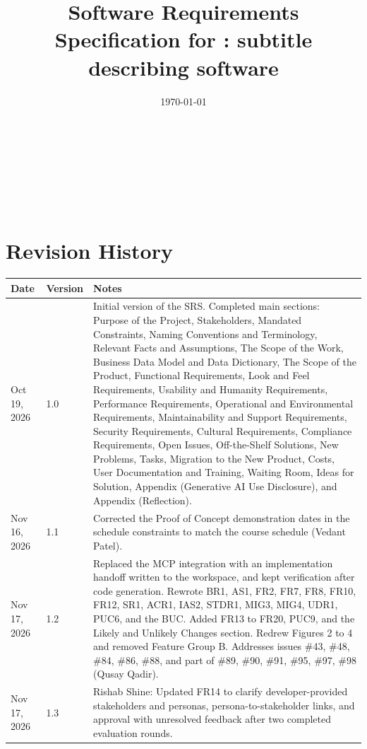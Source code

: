 \documentclass[12pt]{article}
\begin{document}
\title{Software Requirements Specification for \progname: subtitle describing software} 
\author{\authname}
\date{\today}
	
\maketitle

~\newpage


\tableofcontents

~\newpage

\listoftables
\listoffigures

~\newpage

\section*{Revision History}

\begin{longtable}{p{2.6cm}p{1.7cm}p{\dimexpr\textwidth-4.3cm-6\tabcolsep\relax}}
\toprule {\textbf{Date}} & {\textbf{Version}} & {\textbf{Notes}}\\
\midrule
\endhead
Oct 19, 2026 & 1.0 & Initial version of the SRS. Completed main sections: Purpose of the Project, Stakeholders, Mandated Constraints, Naming Conventions and Terminology, Relevant Facts and Assumptions, The Scope of the Work, Business Data Model and Data Dictionary, The Scope of the Product, Functional Requirements, Look and Feel Requirements, Usability and Humanity Requirements, Performance Requirements, Operational and Environmental Requirements, Maintainability and Support Requirements, Security Requirements, Cultural Requirements, Compliance Requirements, Open Issues, Off-the-Shelf Solutions, New Problems, Tasks, Migration to the New Product, Costs, User Documentation and Training, Waiting Room, Ideas for Solution, Appendix (Generative AI Use Disclosure), and Appendix (Reflection).\\
\addlinespace
Nov 16, 2026 & 1.1 & Corrected the Proof of Concept demonstration dates in the schedule constraints to match the course schedule (Vedant Patel).\\
Nov 17, 2026 & 1.2 & Replaced the MCP integration with an implementation handoff written to the workspace, and kept verification after code generation. Rewrote BR1, AS1, FR2, FR7, FR8, FR10, FR12, SR1, ACR1, IAS2, STDR1, MIG3, MIG4, UDR1, PUC6, and the BUC. Added FR13 to FR20, PUC9, and the Likely and Unlikely Changes section. Redrew Figures 2 to 4 and removed Feature Group B. Addresses issues \#43, \#48, \#84, \#86, \#88, and part of \#89, \#90, \#91, \#95, \#97, \#98 (Qusay Qadir).\\

Nov 17, 2026 & 1.3 & Rishab Shine: Updated FR14 to clarify developer-provided
stakeholders and personas, persona-to-stakeholder links, and approval with
unresolved feedback after two completed evaluation rounds.\\
\bottomrule
\end{longtable}
\end{document}

